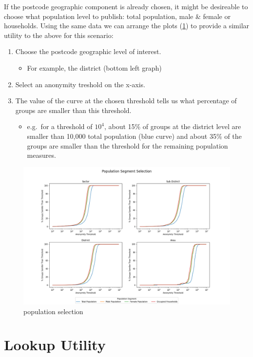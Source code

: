 \documentclass[12pt, a4paper]{article}
\begin{document}
If the postcode geographic component is already chosen, it might be desireable to choose what population level to publish: total population, male \& female or households. Using the same data we can arrange the plots (\cref{fig:population_selection}) to provide a similar utility to the above for this scenario:
\begin{enumerate}
\item Choose the postcode geographic level of interest.
\begin{itemize}
\item For example, the district (bottom left graph)
\end{itemize}
\item Select an anonymity treshold on the x-axis. 
\item The value of the curve at the chosen threshold tells us what percentage of groups are smaller than this threshold.
\begin{itemize}
\item e.g.\ for a threshold of $10^{4}$, about 15\% of groups at the district level are smaller than 10,000 total population (blue curve) and about 35\% of the groups are smaller than the threshold for the remaining population measures.
\end{itemize}
\end{enumerate}
\begin{figure}
\includegraphics[width=1\textwidth,trim={3cm, 0cm, 3cm, 0cm},clip]{images/population_selection.png}
\caption{population selection}\label{fig:population_selection}
\end{figure}

\section{Lookup Utility}\label{lookup-utlity}
\end{document}
